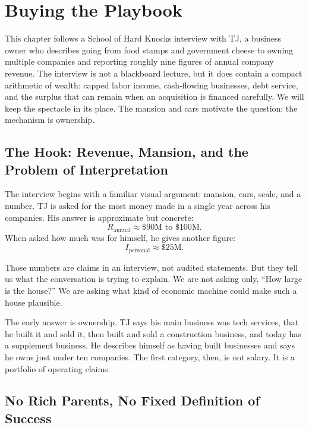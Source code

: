 \chapter{Buying the Playbook}

This chapter follows a School of Hard Knocks interview with TJ, a business owner who describes going from food stamps and government cheese to owning multiple companies and reporting roughly nine figures of annual company revenue. The interview is not a blackboard lecture, but it does contain a compact arithmetic of wealth: capped labor income, cash-flowing businesses, debt service, and the surplus that can remain when an acquisition is financed carefully. We will keep the spectacle in its place. The mansion and cars motivate the question; the mechanism is ownership.

\section{The Hook: Revenue, Mansion, and the Problem of Interpretation}

The interview begins with a familiar visual argument: mansion, cars, scale, and a number. TJ is asked for the most money made in a single year across his companies. His answer is approximate but concrete:
\begin{equation}
R_{\mathrm{annual}} \approx \$90\mathrm{M}\text{ to }\$100\mathrm{M}.
\end{equation}
When asked how much was for himself, he gives another figure:
\begin{equation}
I_{\mathrm{personal}} \approx \$25\mathrm{M}.
\end{equation}

Those numbers are claims in an interview, not audited statements. But they tell us what the conversation is trying to explain. We are not asking only, ``How large is the house?'' We are asking what kind of economic machine could make such a house plausible.

The early answer is ownership. TJ says his main business was tech services, that he built it and sold it, then built and sold a construction business, and today has a supplement business. He describes himself as having built businesses and says he owns just under ten companies. The first category, then, is not salary. It is a portfolio of operating claims.

\section{No Rich Parents, No Fixed Definition of Success}

